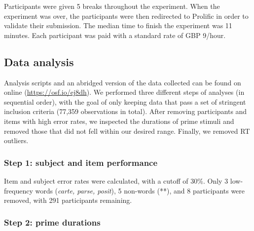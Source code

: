 \documentclass[
]{interact}
\begin{document}
Participants were given 5 breaks throughout the experiment. When the
experiment was over, the participants were then redirected to Prolific
in order to validate their submission. The median time to finish the
experiment was 11 minutes. Each participant was paid with a standard
rate of GBP 9/hour.

\subsection{Data analysis}\label{sec-exp1-analysis}

Analysis scripts and an abridged version of the data collected can be
found on online (\url{https://osf.io/ej8dh}). We performed three
different steps of analyses (in sequential order), with the goal of only
keeping data that pass a set of stringent inclusion criteria (77,359
observations in total). After removing participants and items with high
error rates, we inspected the durations of prime stimuli and removed
those that did not fell within our desired range. Finally, we removed RT
outliers.

\subsubsection{Step 1: subject and item
performance}\label{sec-exp1-analysis-performance}

Item and subject error rates were calculated, with a cutoff of 30\%.
Only 3 low-frequency words (\emph{carte, parse, posit}), 5 non-words
(**), and 8 participants were removed, with 291 participants remaining.

\subsubsection{Step 2: prime
durations}\label{sec-exp1-analysis-primeTime}
\end{document}
